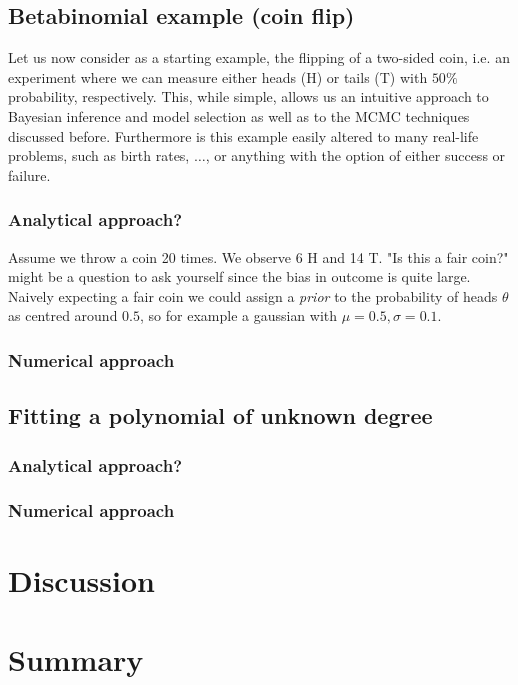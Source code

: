 \documentclass[%
 reprint,
 amsmath,amssymb,
 aps,
]{revtex4-1}
\begin{document}
\subsection{Betabinomial example (coin flip)}
Let us now consider as a starting example, the flipping of a two-sided coin, i.e. an experiment where we can measure either heads (H) or tails (T) with $50\%$ probability, respectively. This, while simple, allows us an intuitive approach to Bayesian inference and model selection as well as to the MCMC techniques discussed before. Furthermore is this example easily altered to many real-life problems, such as birth rates, $\dots$, or anything with the option of either success or failure.
\subsubsection{Analytical approach?}
Assume we throw a coin 20 times. We observe 6 H and 14 T. "Is this a fair coin?" might be a question to ask yourself since the bias in outcome is quite large. Naively expecting a fair coin we could assign a \emph{prior} to the probability of heads $\theta$ as centred around $0.5$, so for example a gaussian with $\mu=0.5,\sigma=0.1$.  
\subsubsection{Numerical approach}

\subsection{Fitting a polynomial of unknown degree}
\subsubsection{Analytical approach?}
\subsubsection{Numerical approach}

\section{Discussion}

\section{Summary}



\end{document}
